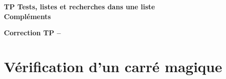 
  
  \textheight 250mm
  \pagestyle{fancy}
  \fancyfoot[C]{\thepage}

  \linespread{1}
  



\begin{center}
{\Large\bf TP Tests, listes et recherches dans une liste\\
Compléments}
\end{center}

\ifdef{\public}{}{}
\cleardoublepage
\renewcommand{\type}{Correction TP}
\setcounter{section}{0}
\begin{center}
{\Large\bf {\type} \no {\num} -- \descrip}
\end{center}


\section{Vérification d'un carré magique}

